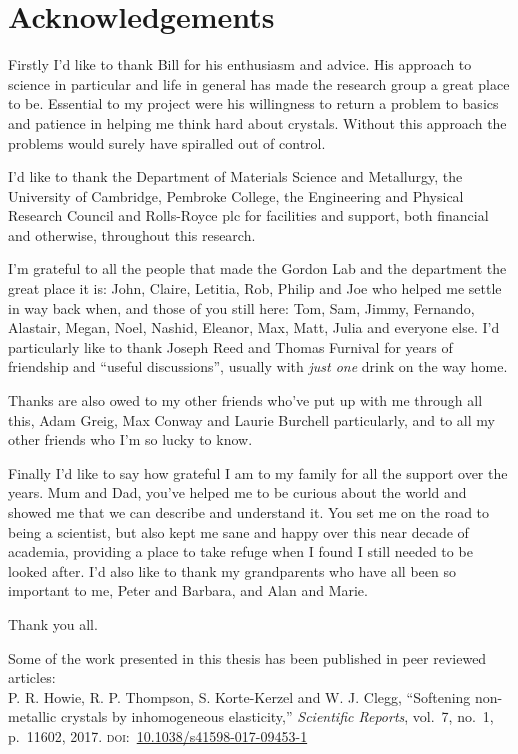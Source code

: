 \clearpage

\doublespacing

\section*{Acknowledgements}


Firstly I'd like to thank Bill for his enthusiasm and advice. His approach to science in particular and life in general has made the research group a great place to be. Essential to my project were his willingness to return a problem to basics and patience in helping me think hard about crystals. Without this approach the problems would surely have spiralled out of control.

I'd like to thank the Department of Materials Science and Metallurgy, the University of Cambridge, Pembroke College, the Engineering and Physical Research Council and Rolls-Royce plc for facilities and support, both financial and otherwise, throughout this research.

I'm grateful to all the people that made the Gordon Lab and the department the great place it is: John, Claire, Letitia, Rob, Philip and Joe who helped me settle in way back when, and those of you still here: Tom, Sam, Jimmy, Fernando, Alastair, Megan, Noel, Nashid, Eleanor, Max, Matt, Julia and everyone else. 
I'd particularly like to thank Joseph Reed and Thomas Furnival for years of friendship and ``useful discussions'', usually with \emph{just one} drink on the way home.

Thanks are also owed to my other friends who've put up with me through all this, Adam Greig, Max Conway and Laurie Burchell particularly, and to all my other friends who I'm so lucky to know.

Finally I'd like to say how grateful I am to my family for all the support over the years.
Mum and Dad, you've helped me to be curious about the world and showed me that we can describe and understand it. You set me on the road to being a scientist, but also kept me sane and happy over this near decade of academia, providing a place to take refuge when I found I still needed to be looked after. I'd also like to thank my grandparents who have all been so important to me, Peter and Barbara, and Alan and Marie.


Thank you all.
\clearpage

Some of the work presented in this thesis has been published in peer reviewed articles:
\\
{\small\singlespacing
P. R. Howie, R. P. Thompson, S. Korte-Kerzel and W. J. Clegg, ``Softening non-metallic crystals by inhomogeneous elasticity,'' \emph{Scientific Reports}, vol.~7, no.~1, p.~11602, 2017. \textsc{doi:}~\url{10.1038/s41598-017-09453-1}}

